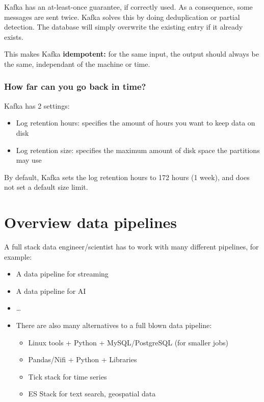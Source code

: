\documentclass{article}
\begin{document}
Kafka has an at-least-once guarantee, if correctly used. 
As a consequence, some messages are sent twice. 
Kafka solves this by doing deduplication or partial detection.
The database will simply overwrite the existing entry if it already exists.

This makes Kafka \textbf{idempotent:} for the same input, the output should always be
the same, independant of the machine or time.

\subsubsection{How far can you go back in time?}

Kafka has 2 settings:

\begin{itemize}
    \item Log retention hours: specifies the amount of hours you want to keep data on disk
    \item Log retention size: specifies the maximum amount of disk space the partitions may use 
\end{itemize}

By default, Kafka sets the log retention hours to 172 hours (1 week), and does not set a default size limit.

\section{Overview data pipelines}
A full stack data engineer/scientist has to work with many different pipelines, for example:

\begin{itemize}
    \item A data pipeline for streaming
    \item A data pipeline for AI
    \item \dots
    \item There are also many alternatives to a full blown data pipeline:
    \begin{itemize}
        \item Linux tools + Python + MySQL/PostgreSQL (for smaller jobs)
        \item Pandas/Nifi + Python + Libraries
        \item Tick stack for time series
        \item ES Stack for text search, geospatial data
    \end{itemize}
\end{itemize}
\end{document}
